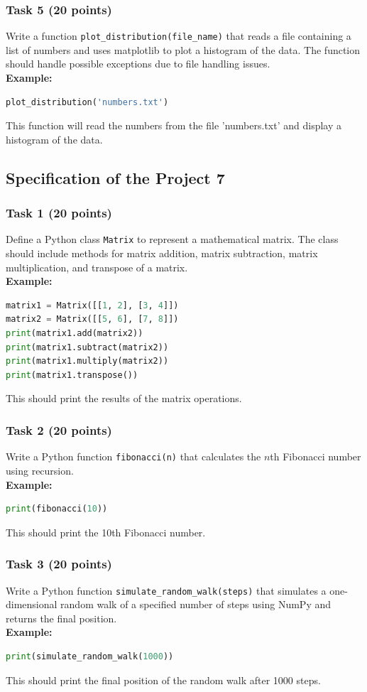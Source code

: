 \documentclass[12pt]{article}
\begin{document}
\subsubsection{Task 5 (20 points)}
Write a function \texttt{plot\_distribution(file\_name)} that reads a file containing a list of numbers and uses matplotlib to plot a histogram of the data. The function should handle possible exceptions due to file handling issues. \\
\textbf{Example:}
\begin{lstlisting}[language=Python]
plot_distribution('numbers.txt')
\end{lstlisting}
This function will read the numbers from the file 'numbers.txt' and display a histogram of the data.

\subsection{Specification of the Project 7}
\subsubsection{Task 1 (20 points)}
Define a Python class \texttt{Matrix} to represent a mathematical matrix. The class should include methods for matrix addition, matrix subtraction, matrix multiplication, and transpose of a matrix. \\
\textbf{Example:}
\begin{lstlisting}[language=Python]
matrix1 = Matrix([[1, 2], [3, 4]])
matrix2 = Matrix([[5, 6], [7, 8]])
print(matrix1.add(matrix2))
print(matrix1.subtract(matrix2))
print(matrix1.multiply(matrix2))
print(matrix1.transpose())
\end{lstlisting}
This should print the results of the matrix operations.

\subsubsection{Task 2 (20 points)}
Write a Python function \texttt{fibonacci(n)} that calculates the $n$th Fibonacci number using recursion. \\
\textbf{Example:}
\begin{lstlisting}[language=Python]
print(fibonacci(10))
\end{lstlisting}
This should print the 10th Fibonacci number.

\subsubsection{Task 3 (20 points)}
Write a Python function \texttt{simulate\_random\_walk(steps)} that simulates a one-dimensional random walk of a specified number of steps using NumPy and returns the final position. \\
\textbf{Example:}
\begin{lstlisting}[language=Python]
print(simulate_random_walk(1000))
\end{lstlisting}
This should print the final position of the random walk after 1000 steps.
\end{document}
